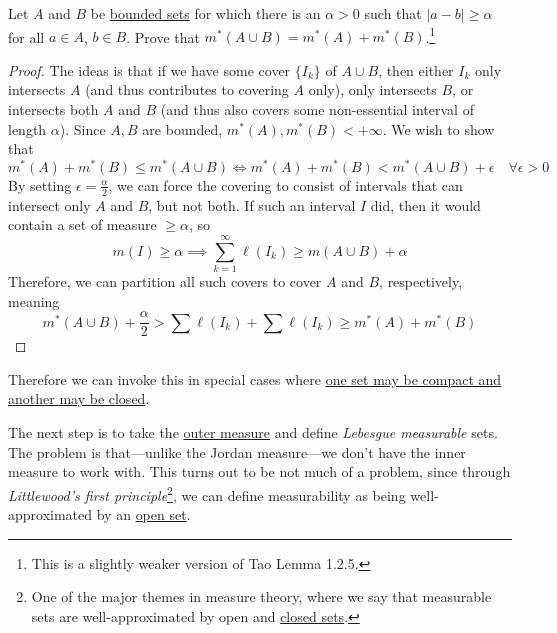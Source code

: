   \begin{lemma}
    \label{thm:finite-additivity-for-outer-measure}
    Let $A$ and $B$ be \hyperref[pst-def:bounded-set]{bounded sets} for which there is an $\alpha > 0$ such that $|a - b| \geq \alpha$ for all $a \in A$, $b \in B$. Prove that $m^{\ast}(A \cup B) = m^{\ast}(A) + m^{\ast}(B)$.\footnote{This is a slightly weaker version of Tao Lemma 1.2.5. }
  \end{lemma}
  \begin{proof}
    The ideas is that if we have some cover $\{I_k\}$ of $A \cup B$, then either $I_k$ only intersects $A$ (and thus contributes to covering $A$ only), only intersects $B$, or intersects both $A$ and $B$ (and thus also covers some non-essential interval of length $\alpha$). Since $A, B$ are bounded, $m^\ast (A), m^\ast (B) < +\infty$. We wish to show that 
    \begin{equation}
      m^\ast (A) + m^\ast (B) \leq m^\ast (A \cup B) \iff m^\ast (A) + m^\ast (B) < m^\ast (A \cup B) + \epsilon \quad \forall \epsilon > 0
    \end{equation}
    By setting $\epsilon = \frac{\alpha}{2}$, we can force the covering to consist of intervals that can intersect only $A$ and $B$, but not both. If such an interval $I$ did, then it would contain a set of measure $\geq \alpha$, so 
    \begin{equation}
      m(I) \geq \alpha \implies \sum_{k=1}^\infty \ell(I_k) \geq m(A \cup B) + \alpha 
    \end{equation}
    Therefore, we can partition all such covers to cover $A$ and $B$, respectively, meaning 
    \begin{equation}
      m^\ast (A \cup B) + \frac{\alpha}{2} > \sum \ell(I_k) + \sum \ell(I_k) \geq m^\ast (A) + m^\ast(B)
    \end{equation}
  \end{proof}
  
  Therefore we can invoke this in special cases where \hyperref[real-ex:compact-closed-dist]{one set may be compact and another may be closed}.


  The next step is to take the \hyperref[def:outer-measure]{outer measure} and define \textit{Lebesgue measurable} sets. The problem is that---unlike the Jordan measure---we don't have the inner measure to work with. This turns out to be not much of a problem, since through \textit{Littlewood's first principle}\footnote{One of the major themes in measure theory, where we say that measurable sets are well-approximated by open and \hyperref[pst-def:closed]{closed sets}.}, we can define measurability as being well-approximated by an \hyperref[pst-def:open-set]{open set}. 
  
